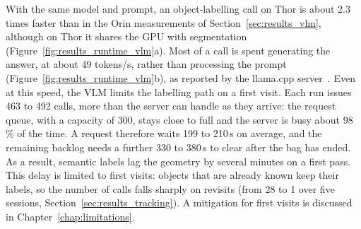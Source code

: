 {\small With the same model and prompt, an object-labelling call on Thor is about 2.3 times faster than in the Orin measurements of Section~\ref{sec:results_vlm}, although on Thor it shares the GPU with segmentation (Figure~\ref{fig:results_runtime_vlm}a). Most of a call is spent generating the answer, at about 49 tokens/s, rather than processing the prompt (Figure~\ref{fig:results_runtime_vlm}b), as reported by the llama.cpp server~\cite{llamacpp}. Even at this speed, the VLM limits the labelling path on a first visit. Each run issues 463 to 492 calls, more than the server can handle as they arrive: the request queue, with a capacity of 300, stays close to full and the server is busy about 98\,\% of the time. A request therefore waits 199 to 210\,s on average, and the remaining backlog needs a further 330 to 380\,s to clear after the bag has ended. As a result, semantic labels lag the geometry by several minutes on a first pass. This delay is limited to first visits: objects that are already known keep their labels, so the number of calls falls sharply on revisits (from 28 to 1 over five sessions, Section~\ref{sec:results_tracking}). A mitigation for first visits is discussed in Chapter~\ref{chap:limitations}.\par}

